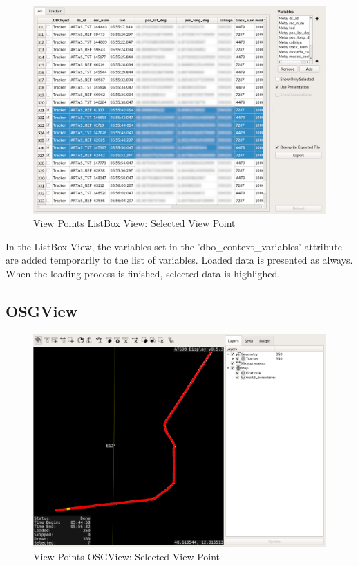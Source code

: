 \begin{figure}[H]
    \hspace*{-2cm}
    \includegraphics[width=18cm,frame]{../screenshots/view_points_listbox_selected.png}
  \caption{View Points ListBox View: Selected View Point}
\end{figure}

In the ListBox View, the variables set in the 'dbo\_context\_variables' attribute are added temporarily to the list of variables. Loaded data is presented as always. When the loading process is finished, selected data is highlighed.


\subsection{OSGView}

\begin{figure}[H]
    \hspace*{-2cm}
    \includegraphics[width=18cm,frame]{../screenshots/view_points_osgview_selected.png}
  \caption{View Points OSGView: Selected View Point}
\end{figure}

